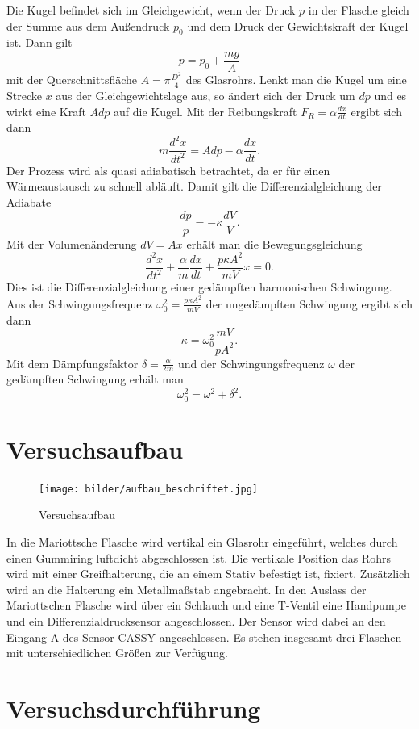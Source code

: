 \documentclass[a4paper, 12pt]{scrartcl}
\begin{document}
Die Kugel befindet sich im Gleichgewicht, wenn der Druck $p$ in der Flasche gleich der Summe aus dem Außendruck $p_0$ und dem Druck der Gewichtskraft der Kugel ist. Dann gilt
$$p = p_0 + \frac{mg}{A}$$
mit der Querschnittsfläche $A = \pi \frac{D^2}4$ des Glasrohrs. Lenkt man die Kugel um eine Strecke $x$ aus der Gleichgewichtslage aus, so ändert sich der Druck um $dp$ und es wirkt eine Kraft $A dp$ auf die Kugel. Mit der Reibungskraft $F_R = \alpha \frac{dx}{dt}$ ergibt sich dann
$$m \frac{d^2x}{dt^2} = Adp - \alpha\frac{dx}{dt}.$$
Der Prozess wird als quasi adiabatisch betrachtet, da er für einen Wärmeaustausch zu schnell abläuft. Damit gilt die Differenzialgleichung der Adiabate
$$\frac{dp}{p} = - \kappa \frac{dV}V.$$
Mit der Volumenänderung $dV = Ax$ erhält man die Bewegungsgleichung
$$\frac{d^2x}{dt^2} + \frac{\alpha}m \frac{dx}{dt} + \frac{p\kappa A^2}{mV}x = 0.$$
Dies ist die Differenzialgleichung einer gedämpften harmonischen Schwingung. Aus der Schwingungsfrequenz $\omega_0^2 = \frac{p\kappa A^2}{mV}$ der ungedämpften Schwingung ergibt sich dann
$$\kappa = \omega_0^2 \frac{mV}{pA^2}.$$
Mit dem Dämpfungsfaktor $\delta = \frac{\alpha}{2m}$ und der Schwingungsfrequenz $\omega$ der gedämpften Schwingung erhält man
$$\omega_0^2 = \omega^2 + \delta^2.$$



\section{Versuchsaufbau}



\begin{figure}[h]
\centering
\texttt{[image: bilder/aufbau\_beschriftet.jpg]}
\caption{Versuchsaufbau}
\end{figure}
In die Mariottsche Flasche wird vertikal ein Glasrohr eingeführt, welches durch einen Gummiring luftdicht abgeschlossen ist. Die vertikale Position das Rohrs wird mit einer Greifhalterung, die an einem Stativ befestigt ist, fixiert. Zusätzlich wird an die Halterung ein Metallmaßstab angebracht. In den Auslass der Mariottschen Flasche wird über ein Schlauch und eine T-Ventil eine Handpumpe und ein Differenzialdrucksensor angeschlossen. Der Sensor wird dabei an den Eingang A des Sensor-CASSY angeschlossen. Es stehen insgesamt drei Flaschen mit unterschiedlichen Größen zur Verfügung.



\section{Versuchsdurchführung}
\end{document}
